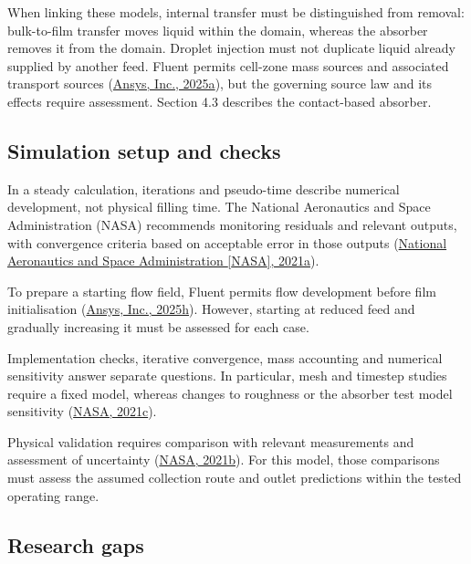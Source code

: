 \documentclass[12pt]{article}
\begin{document}
When linking these models, internal transfer must be distinguished from removal: bulk-to-film transfer moves liquid within the domain, whereas the absorber removes it from the domain. Droplet injection must not duplicate liquid already supplied by another feed. Fluent permits cell-zone mass sources and associated transport sources (\href{https://ansyshelp.ansys.com/public/Views/Secured/corp/v252/en/flu_ug/flu_ug_bcs_sec_cell_zones.html}{Ansys, Inc., 2025a}), but the governing source law and its effects require assessment. Section 4.3 describes the contact-based absorber.

\subsection{Simulation setup and checks}\label{simulation-setup-and-checks}

In a steady calculation, iterations and pseudo-time describe numerical development, not physical filling time. The National Aeronautics and Space Administration (NASA) recommends monitoring residuals and relevant outputs, with convergence criteria based on acceptable error in those outputs (\href{https://www.grc.nasa.gov/www/wind/valid/tutorial/iterconv.html}{National Aeronautics and Space Administration {[}NASA{]}, 2021a}).

To prepare a starting flow field, Fluent permits flow development before film initialisation (\href{https://ansyshelp.ansys.com/public/views/secured/corp/v252/en/flu_ug/flu_ug_ewf_sec_overview.html}{Ansys, Inc., 2025h}). However, starting at reduced feed and gradually increasing it must be assessed for each case.

Implementation checks, iterative convergence, mass accounting and numerical sensitivity answer separate questions. In particular, mesh and timestep studies require a fixed model, whereas changes to roughness or the absorber test model sensitivity (\href{https://www.grc.nasa.gov/www/wind/valid/tutorial/verassess.html}{NASA, 2021c}).

Physical validation requires comparison with relevant measurements and assessment of uncertainty (\href{https://www.grc.nasa.gov/www/wind/valid/tutorial/valassess.html}{NASA, 2021b}). For this model, those comparisons must assess the assumed collection route and outlet predictions within the tested operating range.

\subsection{Research gaps}\label{research-gaps}
\end{document}
